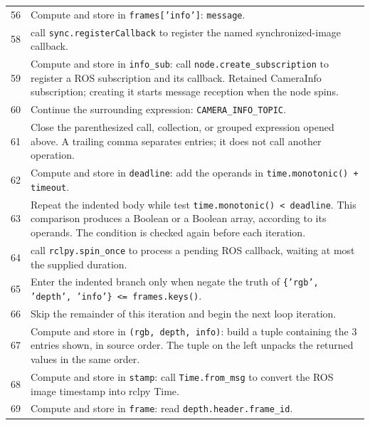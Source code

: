 \documentclass[11pt,a4paper]{book}
\begin{document}
\begin{longtable}{r p{}}
56 & Compute and store in \texttt{frames['info']}: \texttt{message}.  \\

58 & call \texttt{sync.registerCallback} to register the named synchronized-image callback. \\

59 & Compute and store in \texttt{info\_sub}: call \texttt{node.create\_subscription} to register a ROS subscription and its callback. Retained CameraInfo subscription; creating it starts message reception when the node spins. \\

60 & Continue the surrounding expression: \texttt{CAMERA\_INFO\_TOPIC}. \\

61 & Close the parenthesized call, collection, or grouped expression opened above. A trailing comma separates entries; it does not call another operation. \\

62 & Compute and store in \texttt{deadline}: add the operands in \texttt{time.monotonic() + timeout}.  \\

63 & Repeat the indented body while test \texttt{time.monotonic() < deadline}. This comparison produces a Boolean or a Boolean array, according to its operands. The condition is checked again before each iteration. \\

64 & call \texttt{rclpy.spin\_once} to process a pending ROS callback, waiting at most the supplied duration. \\

65 & Enter the indented branch only when negate the truth of \texttt{\{'rgb', 'depth', 'info'\} <= frames.keys()}. \\

66 & Skip the remainder of this iteration and begin the next loop iteration. \\

67 & Compute and store in \texttt{(rgb, depth, info)}: build a tuple containing the 3 entries shown, in source order. The tuple on the left unpacks the returned values in the same order. \\

68 & Compute and store in \texttt{stamp}: call \texttt{Time.from\_msg} to convert the ROS image timestamp into rclpy Time.  \\

69 & Compute and store in \texttt{frame}: read \texttt{depth.header.frame\_id}.  \\


\end{longtable}
\end{document}
